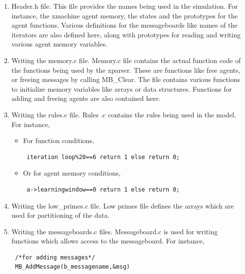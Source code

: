 \begin{enumerate}
\item Header.h file. This file provides the names being used in the simulation. For instance, the
 xmachine agent memory, the states and the prototypes for the agent functions.
Various definitions for the messageboards like names of the iterators are also defined here, along
with prototypes for reading and writing various agent memory variables.

\item Writing the memory.c file. Memory.c file contains the actual function code of the functions
 being used by the xparser. These are functions like free agents, or freeing messages by calling MB\_Clear. The file contains various functions to initialize memory variables like arrays or data structures. Functions for adding and freeing agents are also contained here.

\item Writing the rules.c file. Rules .c contains the rules being used in the model. For instance,

\begin{itemize}
\item For function conditions,

\begin{mylisting}
\begin{verbatim}
 iteration loop%20==6 return 1 else return 0;
 \end{verbatim}
 \end{mylisting}

 \item Or for agent memory conditions,\\

 \begin{mylisting}
\begin{verbatim}
 a->learningwindow==0 return 1 else return 0;
 \end{verbatim}
 \end{mylisting}

 \end{itemize}

 \item Writing the low\_primes.c file. Low primes file defines the arrays which are used for partitioning of the data.
 \item Writing the messageboards.c files. Messageboard.c is used for writing functions which allows access to the messageboard. For instance,\\

 \begin{mylisting}
\begin{verbatim}
 /*for adding messages*/
 MB_AddMessage(b_messagename,&msg)


\end{verbatim}
\end{mylisting}
\end{enumerate}
